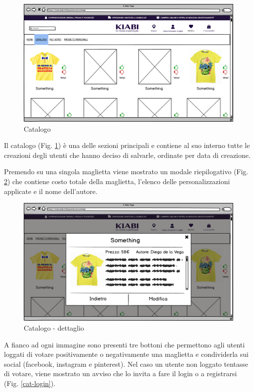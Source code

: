 \documentclass[12pt,italian,]{report}
\begin{document}
\begin{figure}[h]
\centering
\includegraphics{../balsamiq/balsamiq_finale/Catalogo.png}
\caption{Catalogo}
\label{catalogo}
\end{figure}

Il catalogo (Fig. \ref{catalogo}) è una delle sezioni principali e contiene al suo interno tutte le creazioni degli utenti che hanno deciso di salvarle, ordinate per data di creazione.

Premendo su una singola maglietta viene mostrato un modale riepilogativo (Fig. \ref{cat-dett})
che contiene costo totale della maglietta, l'elenco delle
personalizzazioni applicate e il nome dell'autore.

\begin{figure}[h]
\centering
\includegraphics{../balsamiq/balsamiq_finale/Catalogodetails.png}
\caption{Catalogo - dettaglio}
\label{cat-dett}
\end{figure}

A fianco ad ogni immagine sono presenti tre bottoni che permettono agli
utenti loggati di votare positivamente o negativamente una maglietta e condividerla sui social (facebook, instagram e pinterest).
Nel caso un utente non loggato tentasse di votare, viene mostrato un
avviso che lo invita a fare il login o a registrarsi (Fig. \ref{cat-login}).
\end{document}
